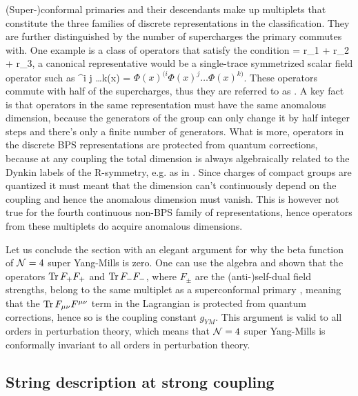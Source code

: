(Super-)conformal primaries and their descendants make up multiplets that constitute the three families of discrete representations in the classification.
They are further distinguished by the number of supercharges the primary commutes with.
One example is a class of operators that satisfy the condition 
\beq
	\label{eq:halfBPS}
	\Delta = r_1 + r_2 + r_3,
\eeq 
a canonical representative would be a single-trace symmetrized scalar field operator such as 
\beq
	^{i j \dots k}(x) = \tr \( \Phi(x)^{(i} \Phi(x)^j \dots \Phi(x)^{k)} \).
\eeq
These operators commute with half of the supercharges, thus they are referred to as . 
A key fact is that operators in the same representation must have the same anomalous dimension, because the generators of the group can only change it by half integer steps and there's only a finite number of generators. 
What is more, operators in the discrete BPS representations are protected from quantum corrections, because at any coupling the total dimension is always algebraically related to the Dynkin labels of the R-symmetry, e.g. as in . 
Since charges of compact groups are quantized it must meant that the dimension can't continuously depend on the coupling and hence the anomalous dimension must vanish. 
This is however not true for the fourth continuous non-BPS family of representations, hence operators from these multiplets do acquire anomalous dimensions.

Let us conclude the section with an elegant argument for why the beta function of $\mathcal{N}=4$ super Yang-Mills is zero.
One can use the algebra and shown that the operators $\mathrm{Tr} \, F_+ F_+$ and $\mathrm{Tr} \, F_- F_- $, where $F_\pm$ are the (anti-)self-dual field strengths, belong to the same multiplet as a superconformal primary \cite{Minahan:2010js}, meaning that the $\mathrm{Tr} \, F_{\mu\nu} F^{\mu\nu}$ term in the Lagrangian is protected from quantum corrections, hence so is the coupling constant $g_{YM}$. 
This argument is valid to all orders in perturbation theory, which means that $\mathcal{N}=4$ super Yang-Mills is conformally invariant to all orders in perturbation theory.

\subsection{String description at strong coupling}

